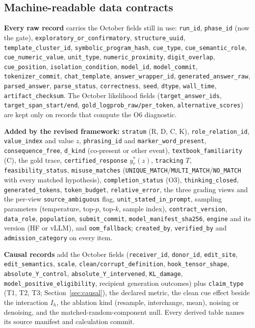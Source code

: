 \documentclass[10pt,a4paper]{article}
\begin{document}
\subsection{Machine-readable data contracts}
\label{sec:contracts}

\textbf{Every raw record} carries the October fields still in use: \texttt{run\_id}, \texttt{phase\_id} (now the
gate), \texttt{exploratory\_or\_confirmatory}, \texttt{structure\_uuid}, \texttt{template\_cluster\_id},
\texttt{symbolic\_program\_hash}, \texttt{cue\_type}, \texttt{cue\_semantic\_role}, \texttt{cue\_numeric\_value},
\texttt{unit\_type}, \texttt{numeric\_proximity}, \texttt{digit\_overlap}, \texttt{cue\_position},
\texttt{isolation\_condition}, \texttt{model\_id}, \texttt{model\_commit}, \texttt{tokenizer\_commit},
\texttt{chat\_template}, \texttt{answer\_wrapper\_id}, \texttt{generated\_answer\_raw}, \texttt{parsed\_answer},
\texttt{parse\_status}, \texttt{correctness}, \texttt{seed}, \texttt{dtype}, \texttt{wall\_time},
\texttt{artifact\_checksum}. The October likelihood fields (\texttt{target\_answer\_ids},
\texttt{target\_span\_start/end}, \texttt{gold\_logprob\_raw/per\_token}, \texttt{alternative\_scores}) are kept
only on records that compute the O6 diagnostic.

\textbf{Added by the revised framework:} \texttt{stratum} (R, D, C, K), \texttt{role\_relation\_id},
\texttt{value\_index} and value $z$, \texttt{phrasing\_id} and \texttt{marker\_word\_present}, \texttt{consequence\_free},
\texttt{d\_kind} (co-present or other event), \texttt{textbook\_familiarity} (C), the gold trace,
\texttt{certified\_response} $y^*_r(z)$, \texttt{tracking} $T$, \texttt{feasibility\_status},
\texttt{misuse\_matches} (\texttt{UNIQUE\_MATCH}/\texttt{MULTI\_MATCH}/\texttt{NO\_MATCH} with every matched
hypothesis), \texttt{completion\_status} (O3), \texttt{thinking\_closed}, \texttt{generated\_tokens},
\texttt{token\_budget}, \texttt{relative\_error}, the three grading views and the per-view
\texttt{source\_ambiguous} flag, \texttt{unit\_stated\_in\_prompt}, sampling parameters (temperature, top-$p$,
top-$k$, sample index), \texttt{contract\_version}, \texttt{data\_role}, \texttt{population},
\texttt{submit\_commit}, \texttt{model\_manifest\_sha256}, \texttt{engine} and its version (HF or vLLM), and
\texttt{oom\_fallback}; \texttt{created\_by}, \texttt{verified\_by} and \texttt{admission\_category} on every item.

\textbf{Causal records} add the October fields (\texttt{receiver\_id}, \texttt{donor\_id}, \texttt{edit\_site},
\texttt{edit\_semantics}, \texttt{scale}, \texttt{clean/corrupt\_definition}, \texttt{hook\_tensor\_shape},
\texttt{absolute\_Y\_control}, \texttt{absolute\_Y\_intervened}, \texttt{KL\_damage},
\texttt{model\_positive\_eligibility}, recipient generation outcomes) plus \texttt{claim\_type} (T1, T2, T3;
Section~\ref{sec:causal}), the declared metric, the clean cue effect beside the interaction $I_h$, the ablation
kind (resample, interchange, mean), noising or denoising, and the matched-random-component null. Every derived
table names its source manifest and calculation commit.
\end{document}
